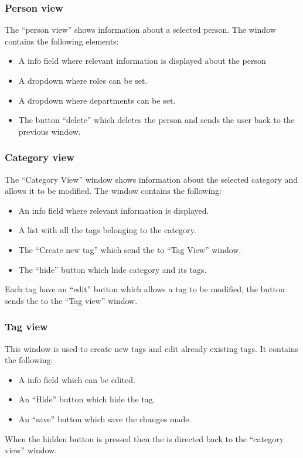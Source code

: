 \subsubsection{Person view}
The ``person view'' shows information about a selected person.
The window contains the following elements:
\begin{itemize}
	\item A info field where relevant information is displayed about the person
	\item A dropdown where roles can be set.
	\item A dropdown where departments can be set.
	\item The button ``delete'' which deletes the person and sends the user back to the previous window. 
\end{itemize}

\subsubsection{Category view}
The ``Category View'' window shows information about the selected category and allows it to be modified. The window contains the following: 

\begin{itemize}
	\item An info field where relevant information is displayed.
	\item A list with all the tags belonging to the category.
	\item The ``Create new tag'' which send the \admin[] to ``Tag View'' window.
	\item The ``hide'' button which hide category and its tags. 
\end{itemize}
Each tag have an ``edit'' button which allows a tag to be modified, the button sends the \admin to the ``Tag view'' window. 

\subsubsection{Tag view}
This window is used to create new tags and edit already existing tags.
It contains the following:
\begin{itemize}
	\item A info field which can be edited.
	\item An ``Hide'' button which hide the tag.
	\item An ``save'' button which save the changes made.
\end{itemize}
When the hidden button is pressed then the \admin[] is directed back to the ``category view'' window.

